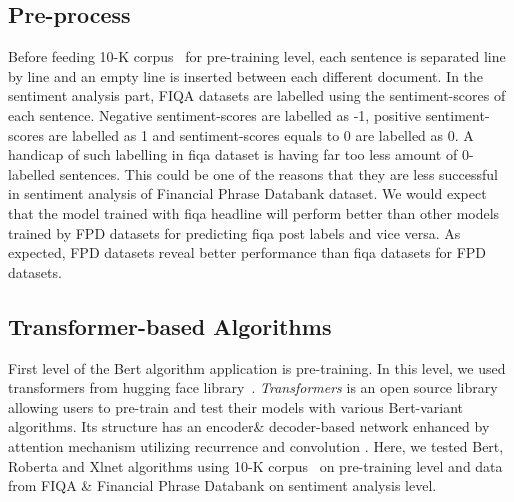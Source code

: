\documentclass[11pt]{article}
\begin{document}
\subsection{Pre-process}
Before feeding 10-K corpus~\cite{kogan2009} for pre-training level, each sentence is separated line by line and  an empty line is inserted between each different document.
\newline
In the sentiment analysis part, FIQA datasets are labelled using the sentiment-scores of each sentence. Negative sentiment-scores are labelled as -1, positive sentiment-scores are labelled as 1 and sentiment-scores equals to 0 are labelled as 0. 
\newline
A handicap of such labelling in fiqa dataset is having far too less amount of 0-labelled sentences. This could be one of the reasons that they are less successful in sentiment analysis of Financial Phrase Databank dataset. We would expect that the model trained with fiqa headline will perform better than other models trained by FPD datasets for predicting fiqa post labels and vice versa.  As expected, FPD datasets reveal better performance than fiqa datasets for FPD datasets. 
\subsection{Transformer-based Algorithms}
First level of the Bert algorithm application is pre-training. In this level, we used transformers from hugging face library~\cite{wolf2019huggingface}. \textit{Transformers} is an open source library allowing users to pre-train and test their models with various Bert-variant algorithms. Its structure has an encoder\& decoder-based network enhanced by attention mechanism utilizing recurrence and convolution \cite{vaswani2017attention}.  
\newline Here, we tested Bert, Roberta and Xlnet algorithms using 10-K corpus~\cite{kogan2009} on pre-training level and data from FIQA \& Financial Phrase Databank on sentiment analysis level.



\end{document}
